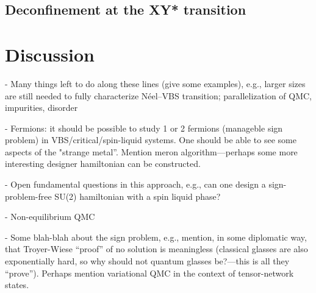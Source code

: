 \documentclass[aps,prb,groupedaddress,twocolumn]{revtex4}
\begin{document}
\subsection{Deconfinement at the XY* transition} \label{XYstar}



\section{Discussion}
- Many things left to do along these lines (give some examples), e.g., larger sizes are still needed
to fully characterize N\'eel--VBS transition; parallelization of QMC, impurities, disorder

- Fermions: it should be possible to study 1 or 2 fermions (manageble sign problem) in 
VBS/critical/spin-liquid systems. One should be able to see some aspects of the "strange metal''.
Mention meron algorithm---perhaps some more interesting designer hamiltonian can be constructed.

- Open fundamental questions in this approach, e.g., can one design a sign-problem-free
  SU(2) hamiltonian with a spin liquid phase?

- Non-equilibrium QMC

- Some blah-blah about the sign problem, e.g., mention, in some diplomatic way, that Troyer-Wiese ``proof'' of no 
solution is meaningless (classical glasses are also exponentially hard, so why should not quantum glasses be?---this
is all they ``prove''). Perhaps mention variational QMC in the context of tensor-network states.


\end{document}
